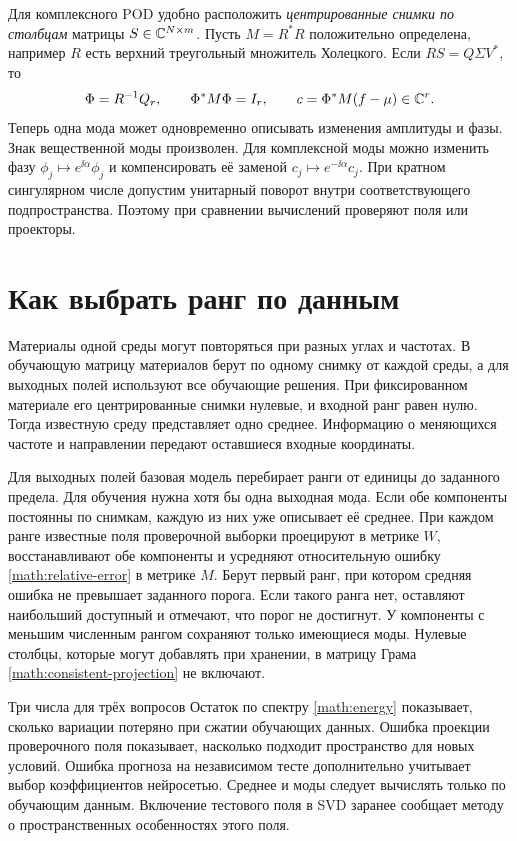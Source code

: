 Для комплексного POD удобно расположить \emph{центрированные снимки по
столбцам} матрицы $S\in\mathbb{C}^{N\times m}$. Пусть $M=R^*R$ положительно
определена, например $R$ есть верхний треугольный множитель Холецкого.
Если $RS=Q\Sigma V^*$, то
\[
 \Phi=R^{-1}Q_r,\qquad \Phi^*M\Phi=I_r,\qquad
 c=\Phi^*M(f-\mu)\in\mathbb{C}^r.
\]
Теперь одна мода может одновременно описывать изменения амплитуды и фазы.
Знак вещественной моды произволен. Для комплексной моды можно изменить
фазу $\phi_j\mapsto e^{\ii\alpha}\phi_j$ и компенсировать её заменой
$c_j\mapsto e^{-\ii\alpha}c_j$. При кратном сингулярном числе допустим
унитарный поворот внутри соответствующего подпространства. Поэтому при
сравнении вычислений проверяют поля или проекторы.

\section{Как выбрать ранг по данным}
Материалы одной среды могут повторяться при разных углах и частотах. В
обучающую матрицу материалов берут по одному снимку от каждой среды,
а для выходных полей используют все обучающие решения. При фиксированном
материале его центрированные снимки нулевые, и входной ранг равен нулю.
Тогда известную среду представляет одно среднее. Информацию о меняющихся
частоте и направлении передают оставшиеся входные координаты.

Для выходных полей базовая модель перебирает ранги от единицы до заданного
предела. Для обучения нужна хотя бы одна выходная мода. Если обе
компоненты постоянны по снимкам, каждую из них уже описывает её среднее.
При каждом ранге известные поля проверочной выборки проецируют в метрике
$W$, восстанавливают обе компоненты и усредняют относительную ошибку
\eqref{math:relative-error} в метрике $M$. Берут первый ранг, при котором
средняя ошибка не превышает заданного порога. Если такого ранга нет,
оставляют наибольший доступный и отмечают, что порог не достигнут.
У компоненты с меньшим численным рангом сохраняют только имеющиеся моды.
Нулевые столбцы, которые могут добавлять при хранении, в матрицу Грама
\eqref{math:consistent-projection} не включают.

\begin{idea}{Три числа для трёх вопросов}
Остаток по спектру \eqref{math:energy} показывает, сколько вариации потеряно
при сжатии обучающих данных. Ошибка проекции проверочного поля показывает,
насколько подходит пространство для новых условий. Ошибка прогноза на
независимом тесте дополнительно учитывает выбор коэффициентов нейросетью.
Среднее и моды следует вычислять только по обучающим данным. Включение
тестового поля в SVD заранее сообщает методу о пространственных
особенностях этого поля.
\end{idea}

